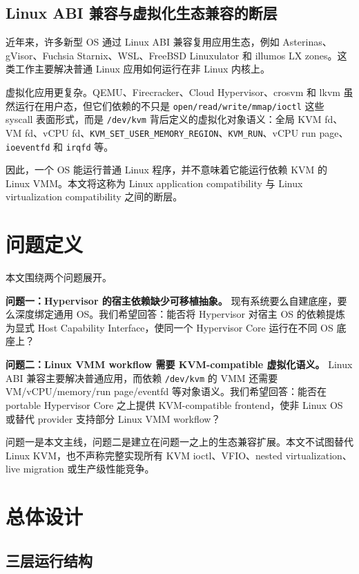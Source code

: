 \documentclass[a4paper,11pt]{article}
\begin{document}
\subsection{Linux ABI 兼容与虚拟化生态兼容的断层}

近年来，许多新型 OS 通过 Linux ABI 兼容复用应用生态，例如 Asterinas、gVisor、Fuchsia Starnix、WSL、FreeBSD Linuxulator 和 illumos LX zones。这类工作主要解决普通 Linux 应用如何运行在非 Linux 内核上。

虚拟化应用更复杂。QEMU、Firecracker、Cloud Hypervisor、crosvm 和 lkvm 虽然运行在用户态，但它们依赖的不只是 \texttt{open/read/write/mmap/ioctl} 这些 syscall 表面形式，而是 \texttt{/dev/kvm} 背后定义的虚拟化对象语义：全局 KVM fd、VM fd、vCPU fd、\texttt{KVM\_SET\_USER\_MEMORY\_REGION}、\texttt{KVM\_RUN}、vCPU run page、\texttt{ioeventfd} 和 \texttt{irqfd} 等。

因此，一个 OS 能运行普通 Linux 程序，并不意味着它能运行依赖 KVM 的 Linux VMM。本文将这称为 Linux application compatibility 与 Linux virtualization compatibility 之间的断层。

\section{问题定义}

本文围绕两个问题展开。

\textbf{问题一：Hypervisor 的宿主依赖缺少可移植抽象。}
现有系统要么自建底座，要么深度绑定通用 OS。我们希望回答：能否将 Hypervisor 对宿主 OS 的依赖提炼为显式 Host Capability Interface，使同一个 Hypervisor Core 运行在不同 OS 底座上？

\textbf{问题二：Linux VMM workflow 需要 KVM-compatible 虚拟化语义。}
Linux ABI 兼容主要解决普通应用，而依赖 \texttt{/dev/kvm} 的 VMM 还需要 VM/vCPU/memory/run page/eventfd 等对象语义。我们希望回答：能否在 portable Hypervisor Core 之上提供 KVM-compatible frontend，使非 Linux OS 或替代 provider 支持部分 Linux VMM workflow？

问题一是本文主线，问题二是建立在问题一之上的生态兼容扩展。本文不试图替代 Linux KVM，也不声称完整实现所有 KVM ioctl、VFIO、nested virtualization、live migration 或生产级性能竞争。

\section{总体设计}

\subsection{三层运行结构}
\end{document}
